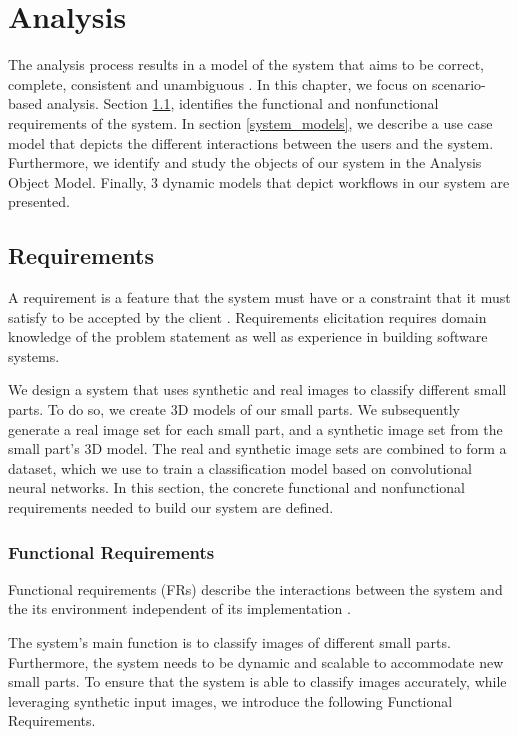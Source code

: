 \chapter{Analysis}\label{ch:analysis}

The analysis process results in a model of the system that aims to be correct, complete, consistent and unambiguous \cite{bruegge2004object}. In this chapter, we focus on scenario-based analysis. Section \ref{requirements}, identifies the functional and nonfunctional requirements of the system. In section \ref{system_models}, we describe a use case model that depicts the different interactions between the users and the system. Furthermore, we identify and study the objects of our system in the Analysis Object Model. Finally, 3 dynamic models that depict workflows in our system are presented.


\section{Requirements}\label{requirements}

A requirement is a feature that the system must have or a constraint that it must satisfy to be accepted by the client \cite{bruegge2004object}. Requirements elicitation requires domain knowledge of the problem statement as well as experience in building software systems.

We design a system that uses synthetic and real images to classify different small parts. To do so, we create 3D models of our small parts. We subsequently generate a real image set for each small part, and a synthetic image set from the small part's 3D model. The real and synthetic image sets are combined to form a dataset, which we use to train a classification model based on convolutional neural networks. In this section, the concrete functional and nonfunctional requirements needed to build our system are defined.

\subsection{Functional Requirements}
Functional requirements (FRs) describe the interactions between the system and the its environment independent of its implementation \cite{bruegge2004object}.

The system's main function is to classify images of different small parts. Furthermore, the system needs to be dynamic and scalable to accommodate new small parts. To ensure that the system is able to classify images accurately, while leveraging synthetic input images, we introduce the following Functional Requirements.

